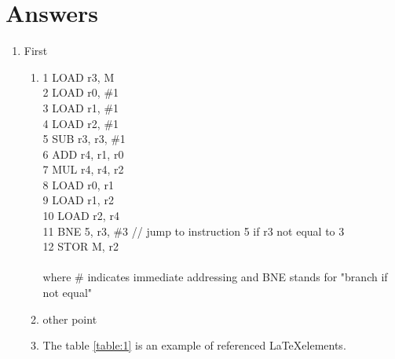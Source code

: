 \documentclass[12pt]{article}
\begin{document}
    \section*{Answers}
    \begin{enumerate}
        \item First
        \begin{enumerate}
            \item 1 LOAD r3, M\\
            2 LOAD r0, \#1\\
            3 LOAD r1, \#1\\
            4 LOAD r2, \#1\\
            5 SUB r3, r3, \#1\\
            6 ADD r4, r1, r0\\
            7 MUL r4, r4, r2\\
            8 LOAD r0, r1\\
            9 LOAD r1, r2\\
            10 LOAD r2, r4\\
            11 BNE 5, r3, \#3 // jump to instruction 5 if r3 not equal to 3\\
            12 STOR M, r2\\
            \\
            where \# indicates immediate addressing and BNE stands for "branch if not equal"
            \\
            \item other point
            \item The table \ref{table:1} is an example of referenced \LaTeX elements.
 

\end{enumerate}
\end{enumerate}
\end{document}
